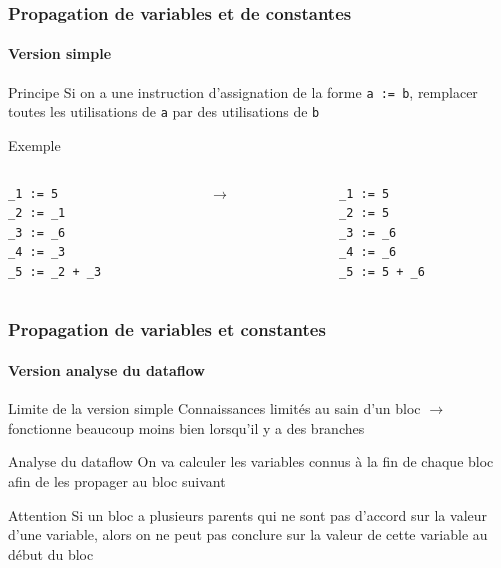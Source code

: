 \documentclass{beamer}
\begin{document}
\begin{frame}[fragile]
    \frametitle{Propagation de variables et de constantes}
    \framesubtitle{Version simple}

    \begin{block}{Principe}
        Si on a une instruction d'assignation de la forme \lstinline{a := b}, remplacer
        toutes les utilisations de \lstinline{a} par des utilisations de \lstinline{b}
    \end{block}
    \pause
    \begin{exampleblock}{Exemple}
         \begin{columns}
            \begin{column}{.40\textwidth}
                    \begin{lstlisting}
_1 := 5
_2 := _1
_3 := _6
_4 := _3
_5 := _2 + _3
                    \end{lstlisting}
            \end{column}
            \pause
            \begin{column}{.04\textwidth}
                $\rightarrow$
            \end{column}
            \begin{column}{.40\textwidth}
                    \begin{lstlisting}
_1 := 5
_2 := 5
_3 := _6
_4 := _6
_5 := 5 + _6
                    \end{lstlisting}
            \end{column}
        \end{columns}       
    \end{exampleblock}
\end{frame}
\begin{frame}
    \frametitle{Propagation de variables et constantes}
    \framesubtitle{Version analyse du dataflow}

    \begin{block}{Limite de la version simple}
        Connaissances limités au sain d'un bloc $\rightarrow$ fonctionne beaucoup moins bien lorsqu'il y a des branches
    \end{block}
    \pause
    \begin{block}{Analyse du dataflow}
        On va calculer les variables connus à la fin de chaque bloc afin de les propager au bloc suivant
    \end{block}

    \pause
    \begin{alertblock}{Attention}
        Si un bloc a plusieurs parents qui ne sont pas d'accord sur la valeur d'une variable,
        alors on ne peut pas conclure sur la valeur de cette variable au début du bloc
    \end{alertblock}
    
\end{frame}
\end{document}
